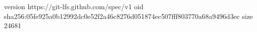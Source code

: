 version https://git-lfs.github.com/spec/v1
oid sha256:05fe925a0b12992dc0e52f2a46c8276d051874ec507fff803770a68a9496d3ec
size 24681
